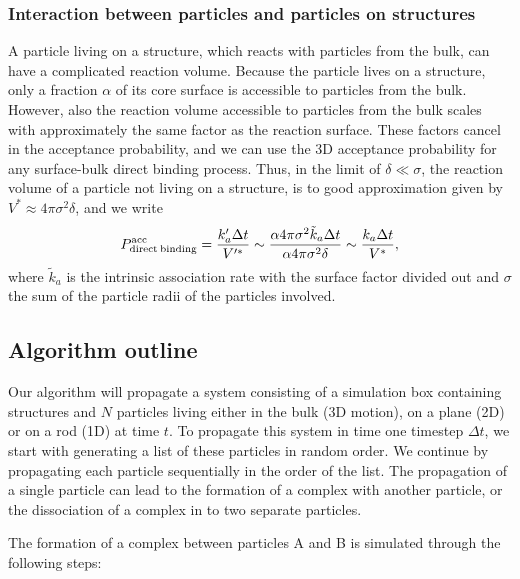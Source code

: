 \subsubsection{Interaction between particles and particles on structures}
A particle living on a structure, which reacts with particles from the bulk, can have a complicated reaction volume. Because the particle lives on a structure, only a fraction $\alpha$ of its core surface is accessible to particles from the bulk. However, also the reaction volume accessible to particles from the bulk scales with approximately the same factor as the reaction surface. These factors cancel in the acceptance probability, and we can use the 3D acceptance probability for any surface-bulk direct binding process. Thus, in the limit of $\delta \ll \sigma$, the reaction volume of a particle not living on a structure, is to good approximation given by $V^* \approx 4 \pi \sigma^2 \delta$, and we write
\begin{equation}
 P^{\rm acc}_{\rm direct\:binding} = \frac{k'_a \Delta t}{V'^*} \sim \frac{ \alpha 4 \pi \sigma^2 \tilde{k}_a \Delta t}{\alpha 4 \pi \sigma^2 \delta} \sim \frac{k_a \Delta t}{V^*},
\end{equation}
where $\tilde{k}_a$ is the intrinsic association rate with the surface factor divided out and $\sigma$ the sum of the particle radii of the particles involved.

\subsection{Algorithm outline}
Our algorithm will propagate a system consisting of a simulation box containing structures and $N$ particles living either in the bulk (3D motion), on a plane (2D) or on a rod (1D) at time $t$. To propagate this system in time one timestep $\Delta t$, we start with generating a list of these particles in random order. We continue by propagating each particle sequentially in the order of the list. The propagation of a single particle can lead to the formation of a complex with another particle, or the dissociation of a complex in to two separate particles. 

The formation of a complex between particles A and B is simulated through the following steps:


